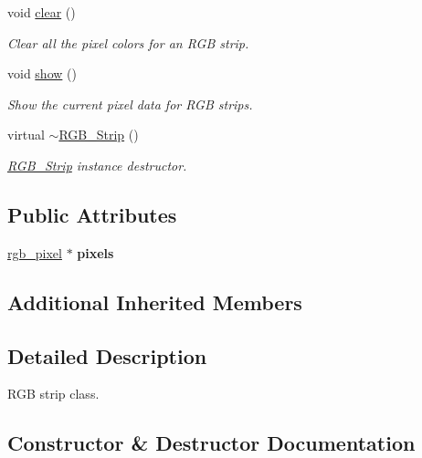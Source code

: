 \begin{DoxyCompactItemize}
void \mbox{\hyperlink{classRGB__Strip_a68257e7b8afda71ad51b862b428e3e63}{clear}} ()
\begin{DoxyCompactList}\small\item\em Clear all the pixel colors for an R\+GB strip. \end{DoxyCompactList}\item 
void \mbox{\hyperlink{classRGB__Strip_a0cadc931b23e8d5f0ee4bfd8eac92e0b}{show}} ()
\begin{DoxyCompactList}\small\item\em Show the current pixel data for R\+GB strips. \end{DoxyCompactList}\item 
\mbox{\label{classRGB__Strip_aa1d70039fe6425a0b691f314876b6dea}} 
virtual \mbox{\hyperlink{classRGB__Strip_aa1d70039fe6425a0b691f314876b6dea}{$\sim$\+R\+G\+B\+\_\+\+Strip}} ()
\begin{DoxyCompactList}\small\item\em \mbox{\hyperlink{classRGB__Strip}{R\+G\+B\+\_\+\+Strip}} instance destructor. \end{DoxyCompactList}\end{DoxyCompactItemize}
\subsection*{Public Attributes}
\begin{DoxyCompactItemize}
\item 
\mbox{\label{classRGB__Strip_a5c9e97aa82596ad3c138dd48c168f65a}} 
\mbox{\hyperlink{structrgb__pixel}{rgb\+\_\+pixel}} $\ast$ {\bfseries pixels}
\end{DoxyCompactItemize}
\subsection*{Additional Inherited Members}


\subsection{Detailed Description}
R\+GB strip class. 

\subsection{Constructor \& Destructor Documentation}
\mbox{\label{classRGB__Strip_a9e827e6aa443285a811a11df0b64f5aa}} 
